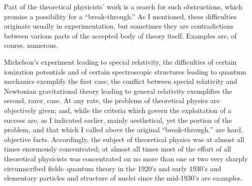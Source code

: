\documentclass{article}
\begin{document}
Part of the theoretical physicists' work is a search for such obstructions, which promise a possibility for a ``break-through.'' As I mentioned, these difficulties originate usually in experimentation, but sometimes they are contradictions between various parts of the accepted body of theory itself. Examples are, of course, numerous.

Michelson's experiment leading to special relativity, the difficulties of certain ionization potentials and of certain spectroscopic structures leading to quantum mechanics exemplify the first case; the conflict between special relativity and Newtonian gravitational theory leading to general relativity exemplifies the second, rarer, case. At any rate, the problems of theoretical physics are objectively given; and, while the criteria which govern the exploitation of a success are, as I indicated earlier, mainly aesthetical, yet the portion of the problem, and that which I called above the original ``break-through,'' are hard, objective facts. Accordingly, the subject of theoretical physics was at almost all times enormously concentrated; at almost all times most of the effort of all theoretical physicists was concentrated on no more than one or two very sharply circumscribed fields--quantum theory in the 1920's and early 1930's and elementary particles and structure of nuclei since the mid-1930's are examples.
\end{document}
